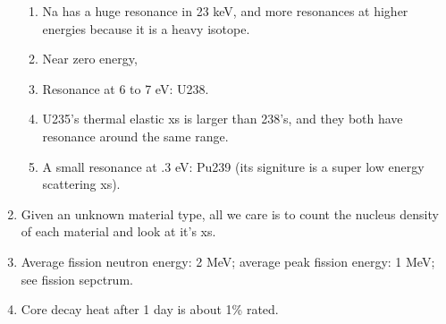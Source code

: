 \documentclass{school-22.211-notes}
\begin{document}
\begin{enumerate}
\begin{enumerate}
\item Na has a huge resonance in 23 keV, and more resonances at higher energies because it is a heavy isotope.
\item Near zero energy,
\item Resonance at 6 to 7 eV: U238. 
\item U235's thermal elastic xs is larger than 238's, and they both have resonance around the same range.   
\item A small resonance at .3 eV: Pu239 (its signiture is a super low energy scattering xs). 
\end{enumerate}

\item Given an unknown material type, all we care is to count the nucleus density of each material and look at it's xs. 
\item Average fission neutron energy: 2 MeV; average peak fission energy: 1 MeV; see fission sepctrum. 

\item Core decay heat after 1 day is about 1\% rated. 


\end{enumerate}
\end{document}
